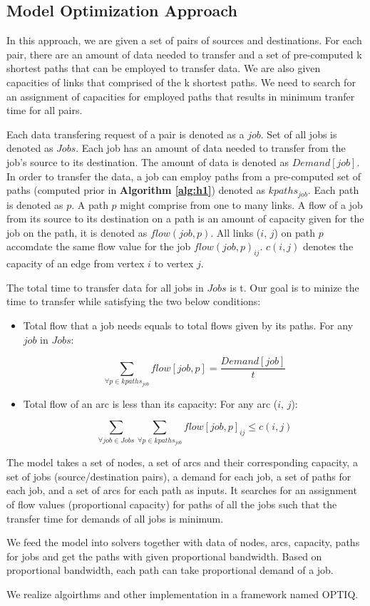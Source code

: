 \subsection{Model Optimization Approach}
\label{sec:optimization}

In this approach, we are given a set of pairs of sources and destinations. For each pair, there are an amount of data needed to transfer and a set of pre-computed k shortest paths that can be employed to transfer data. We are also given capacities of links that comprised of the k shortest paths. We need to search for an assignment of capacities for employed paths that results in minimum tranfer time for all pairs. 

Each data transfering request of a pair is denoted as a $job$. Set of all jobs is denoted as $Jobs$. Each job has an amount of data needed to transfer from the job's source to its destination. The amount of data is denoted as $Demand[job]$. In order to transfer the data, a job can employ paths from a pre-computed set of paths (computed prior in \textbf{Algorithm \ref{alg:h1}}) denoted as $kpaths_{job}$. Each path is denoted as $p$. A path $p$ might comprise from one to many links. A flow of a job from its source to its destination on a path is an amount of capacity given for the job on the path, it is denoted as $flow(job, p)$. All links ($i$, $j$) on path $p$ accomdate the same flow value for the job $flow(job, p)_{ij}$. $c(i,j)$ denotes the capacity of an edge from vertex $i$ to vertex $j$.

The total time to transfer data for all jobs in $Jobs$ is t. Our goal is to minize the time to transfer while satisfying the two below conditions:

\begin{itemize}
\item Total flow that a job needs equals to total flows given by its paths. For any $job$ in $Jobs$: 

$$\sum_{\forall p \in kpaths_{job}} flow[job, p] = \frac{Demand[job]}{t}$$

\item Total flow of an arc is less than its capacity: For any arc ($i$, $j$):

$$\sum_{\forall job \in Jobs}\sum_{\forall p \in kpaths_{job}} flow[job, p]_{ij} \leq c(i, j) $$

\end{itemize}

%

The model takes a set of nodes, a set of arcs and their corresponding capacity, a set of jobs (source/destination pairs), a demand for each job, a set of paths for each job, and a set of arcs for each path as inputs. It searches for an assignment of flow values (proportional capacity) for paths of all the jobs such that the transfer time for demands of all jobs is minimum.

We feed the model into solvers together with data of nodes, arcs, capacity, paths for jobs and get the paths with given proportional bandwidth. Based on proportional bandwidth, each path can take proportional demand of a job.

We realize algoirthms and other implementation in a framework named OPTIQ.
